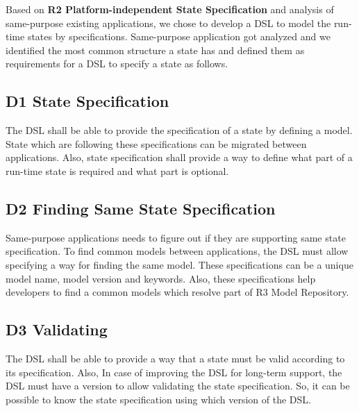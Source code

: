 Based on \textbf{R2 Platform-independent State Specification} and analysis of same-purpose existing applications, we chose to develop a DSL to model the run-time states by specifications. 
Same-purpose application got analyzed and we identified the most common structure a state has and defined them as requirements for a DSL to specify a state as follows.


\subsection{D1 State Specification}
The DSL shall be able to provide the specification of a state by defining a model. State which are following these specifications can be migrated between applications. Also, state specification shall provide a way to define what part of a run-time state is required and what part is optional.

\subsection{D2 Finding Same State Specification}
Same-purpose applications needs to figure out if they are supporting same state specification. To find common models between applications, the DSL must allow specifying a way for finding the same model. These specifications can be a unique model name, model version and keywords. Also, these specifications help developers to find a common models which resolve part of R3 Model Repository.

\subsection{D3 Validating}    
The DSL shall be able to provide a way that a state must be valid according to its specification. Also, In case of improving the DSL for long-term support, the DSL must have a version to allow validating the state specification. So, it can be possible to know the state specification using which version of the DSL.